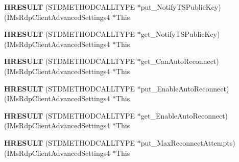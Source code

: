\begin{DoxyCompactItemize}
\item 
\mbox{\label{struct_i_ms_rdp_client_advanced_settings4_vtbl_a2942ca61fd0ad78eabaac04817cdd517}} 
{\bfseries H\+R\+E\+S\+U\+LT} (S\+T\+D\+M\+E\+T\+H\+O\+D\+C\+A\+L\+L\+T\+Y\+PE $\ast$put\+\_\+\+Notify\+T\+S\+Public\+Key)(I\+Ms\+Rdp\+Client\+Advanced\+Settings4 $\ast$This
\item 
\mbox{\label{struct_i_ms_rdp_client_advanced_settings4_vtbl_abf9ccdb92b9bea5b9808a5edf5e2e900}} 
{\bfseries H\+R\+E\+S\+U\+LT} (S\+T\+D\+M\+E\+T\+H\+O\+D\+C\+A\+L\+L\+T\+Y\+PE $\ast$get\+\_\+\+Notify\+T\+S\+Public\+Key)(I\+Ms\+Rdp\+Client\+Advanced\+Settings4 $\ast$This
\item 
\mbox{\label{struct_i_ms_rdp_client_advanced_settings4_vtbl_adb410c1e7758a88ce4365e016a21bcd1}} 
{\bfseries H\+R\+E\+S\+U\+LT} (S\+T\+D\+M\+E\+T\+H\+O\+D\+C\+A\+L\+L\+T\+Y\+PE $\ast$get\+\_\+\+Can\+Auto\+Reconnect)(I\+Ms\+Rdp\+Client\+Advanced\+Settings4 $\ast$This
\item 
\mbox{\label{struct_i_ms_rdp_client_advanced_settings4_vtbl_acbe4bada79dda2a4ccc0d4aa5453331b}} 
{\bfseries H\+R\+E\+S\+U\+LT} (S\+T\+D\+M\+E\+T\+H\+O\+D\+C\+A\+L\+L\+T\+Y\+PE $\ast$put\+\_\+\+Enable\+Auto\+Reconnect)(I\+Ms\+Rdp\+Client\+Advanced\+Settings4 $\ast$This
\item 
\mbox{\label{struct_i_ms_rdp_client_advanced_settings4_vtbl_af9a0f5d3df3374a7f67ecb3670e949c7}} 
{\bfseries H\+R\+E\+S\+U\+LT} (S\+T\+D\+M\+E\+T\+H\+O\+D\+C\+A\+L\+L\+T\+Y\+PE $\ast$get\+\_\+\+Enable\+Auto\+Reconnect)(I\+Ms\+Rdp\+Client\+Advanced\+Settings4 $\ast$This
\item 
\mbox{\label{struct_i_ms_rdp_client_advanced_settings4_vtbl_aecf91a47919a2402b5cbbcd9285dd253}} 
{\bfseries H\+R\+E\+S\+U\+LT} (S\+T\+D\+M\+E\+T\+H\+O\+D\+C\+A\+L\+L\+T\+Y\+PE $\ast$put\+\_\+\+Max\+Reconnect\+Attempts)(I\+Ms\+Rdp\+Client\+Advanced\+Settings4 $\ast$This
\item 
\mbox{\label{struct_i_ms_rdp_client_advanced_settings4_vtbl_a9bb6cba378614b0e4c21f36c9d535a0a}} 

\end{DoxyCompactItemize}
